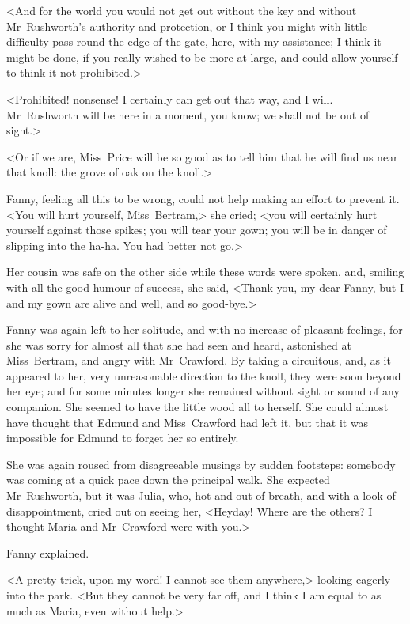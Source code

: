 <And for the world you would not get out without the key and without Mr~Rushworth's authority and protection, or I think you might with little difficulty pass round the edge of the gate, here, with my assistance; I think it might be done, if you really wished to be more at large, and could allow yourself to think it not prohibited.>

<Prohibited! nonsense! I certainly can get out that way, and I will. Mr~Rushworth will be here in a moment, you know; we shall not be out of sight.>

<Or if we are, Miss~Price will be so good as to tell him that he will find us near that knoll: the grove of oak on the knoll.>

Fanny, feeling all this to be wrong, could not help making an effort to prevent it. <You will hurt yourself, Miss~Bertram,> she cried; <you will certainly hurt yourself against those spikes; you will tear your gown; you will be in danger of slipping into the ha-ha. You had better not go.>

Her cousin was safe on the other side while these words were spoken, and, smiling with all the good-humour of success, she said, <Thank you, my dear Fanny, but I and my gown are alive and well, and so good-bye.>

Fanny was again left to her solitude, and with no increase of pleasant feelings, for she was sorry for almost all that she had seen and heard, astonished at Miss~Bertram, and angry with Mr~Crawford. By taking a circuitous, and, as it appeared to her, very unreasonable direction to the knoll, they were soon beyond her eye; and for some minutes longer she remained without sight or sound of any companion. She seemed to have the little wood all to herself. She could almost have thought that Edmund and Miss~Crawford had left it, but that it was impossible for Edmund to forget her so entirely.

She was again roused from disagreeable musings by sudden footsteps: somebody was coming at a quick pace down the principal walk. She expected Mr~Rushworth, but it was Julia, who, hot and out of breath, and with a look of disappointment, cried out on seeing her, <Heyday! Where are the others? I thought Maria and Mr~Crawford were with you.>

Fanny explained.

<A pretty trick, upon my word! I cannot see them anywhere,> looking eagerly into the park. <But they cannot be very far off, and I think I am equal to as much as Maria, even without help.>


